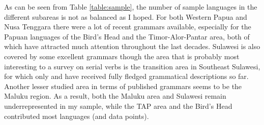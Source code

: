 As can be seen from Table \ref{table:sample}, the number of sample languages in the different subareas is not as balanced as I hoped. For both Western Papua and Nusa Tenggara there were a lot of recent grammars available, especially for the Papuan languages of the Bird's Head and the Timor-Alor-Pantar area, both of which have attracted much attention throughout the last decades. Sulawesi is also covered by some excellent grammars though the area that is probably most interesting to a survey on serial verbs is the transition area in Southeast Sulawesi, for which only  \citep{vandenberg1989} and  \citep{donohue1999} have received fully fledged grammatical descriptions so far. Another lesser studied area in terms of published grammars seems to be the Maluku region. As a result, both the Maluku area and Sulawesi remain underrepresented in my sample, while the TAP area and the Bird's Head contributed most languages (and data points).

